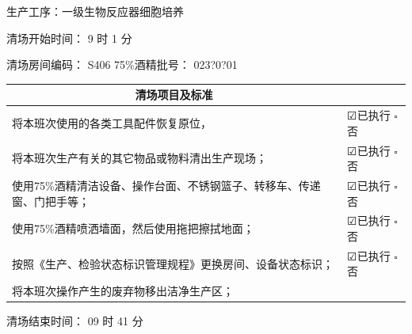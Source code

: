 \documentclass[UTF8,10pt,a4paper,fontset=fandol]{ctexart}
\newcommand{\fieldvalue}[1]{#1}
\newcommand{\handwritten}[1]{#1}
\begin{document}
生产工序：一级生物反应器细胞培养

清场开始时间：
\fieldvalue{\handwritten{9}} 时
\fieldvalue{\handwritten{1}} 分

清场房间编码：
\fieldvalue{\handwritten{S406}}
\hfill
75\%酒精批号：
\fieldvalue{\handwritten{023?0?01}}

\medskip

\begin{tabularx}{\textwidth}{|X|>{\centering\arraybackslash}p{}|}
\hline
\multicolumn{1}{|c|}{清场项目及标准} &
\multicolumn{1}{c|}{执行情况} \\
\hline
将本班次使用的各类工具配件恢复原位， &
\fieldvalue{\handwritten{☑}}已执行 \quad $\square$否 \\
\hline
将本班次生产有关的其它物品或物料清出生产现场； &
\fieldvalue{\handwritten{☑}}已执行 \quad $\square$否 \\
\hline
使用75\%酒精清洁设备、操作台面、不锈钢篮子、转移车、传递窗、门把手等； &
\fieldvalue{\handwritten{☑}}已执行 \quad $\square$否 \\
\hline
使用75\%酒精喷洒墙面，然后使用拖把擦拭地面； &
\fieldvalue{\handwritten{☑}}已执行 \quad $\square$否 \\
\hline
按照《生产、检验状态标识管理规程》更换房间、设备状态标识； &
\fieldvalue{\handwritten{☑}}已执行 \quad $\square$否 \\
\hline
将本班次操作产生的废弃物移出洁净生产区； &
\end{tabularx}

\medskip

清场结束时间：
\fieldvalue{\handwritten{09}} 时
\fieldvalue{\handwritten{41}} 分
\end{document}
